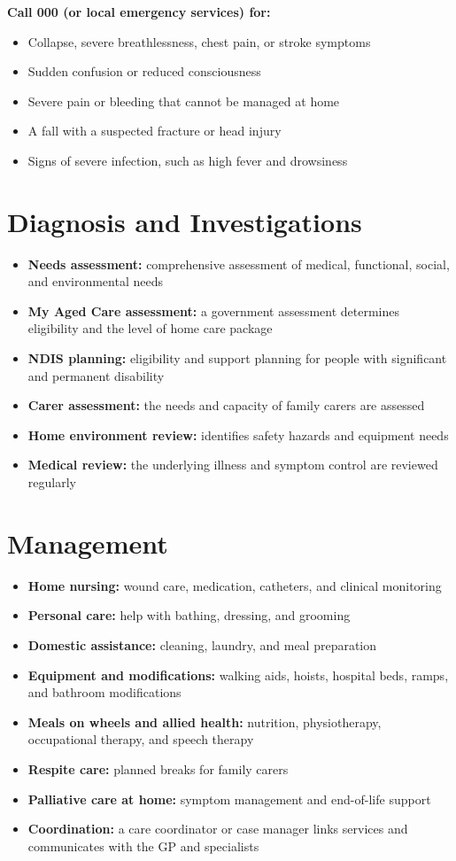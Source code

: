 \textbf{Call 000 (or local emergency services) for:}
\begin{itemize}
    \item Collapse, severe breathlessness, chest pain, or stroke symptoms
    \item Sudden confusion or reduced consciousness
    \item Severe pain or bleeding that cannot be managed at home
    \item A fall with a suspected fracture or head injury
    \item Signs of severe infection, such as high fever and drowsiness
\end{itemize}

\section*{Diagnosis and Investigations}
\begin{itemize}
    \item \textbf{Needs assessment:} comprehensive assessment of medical, functional, social, and environmental needs
    \item \textbf{My Aged Care assessment:} a government assessment determines eligibility and the level of home care package
    \item \textbf{NDIS planning:} eligibility and support planning for people with significant and permanent disability
    \item \textbf{Carer assessment:} the needs and capacity of family carers are assessed
    \item \textbf{Home environment review:} identifies safety hazards and equipment needs
    \item \textbf{Medical review:} the underlying illness and symptom control are reviewed regularly
\end{itemize}

\section*{Management}
\begin{itemize}
    \item \textbf{Home nursing:} wound care, medication, catheters, and clinical monitoring
    \item \textbf{Personal care:} help with bathing, dressing, and grooming
    \item \textbf{Domestic assistance:} cleaning, laundry, and meal preparation
    \item \textbf{Equipment and modifications:} walking aids, hoists, hospital beds, ramps, and bathroom modifications
    \item \textbf{Meals on wheels and allied health:} nutrition, physiotherapy, occupational therapy, and speech therapy
    \item \textbf{Respite care:} planned breaks for family carers
    \item \textbf{Palliative care at home:} symptom management and end-of-life support
    \item \textbf{Coordination:} a care coordinator or case manager links services and communicates with the GP and specialists
\end{itemize}


